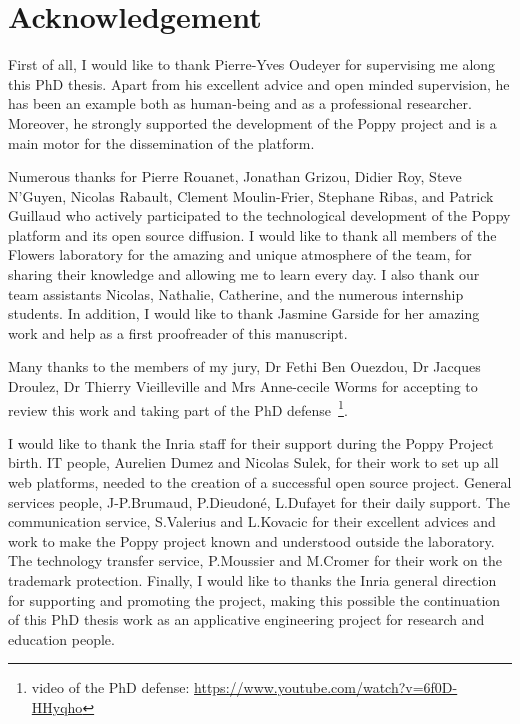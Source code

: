 %
\chapter*{Acknowledgement}
\label{sec:acknowledgement}
\vspace*{-10mm}


First of all, I would like to thank Pierre-Yves Oudeyer for supervising me along this PhD thesis.  Apart from his excellent advice and open minded supervision, he has been an example both as human-being and as a professional researcher. Moreover, he strongly supported the development of the Poppy project and is a main motor for the dissemination of the platform.

Numerous thanks for Pierre Rouanet, Jonathan Grizou, Didier Roy, Steve N'Guyen, Nicolas Rabault, Clement Moulin-Frier, Stephane Ribas, and Patrick Guillaud who actively participated to the technological development of the Poppy platform and its open source diffusion. I would like to thank all members of the Flowers laboratory for the amazing and unique atmosphere of the team, for sharing their knowledge and allowing me to learn every day. I also thank our team assistants Nicolas, Nathalie, Catherine, and the numerous internship students. In addition, I would like to thank Jasmine Garside for her amazing work and help as a first proofreader of this manuscript.

Many thanks to the members of my jury, Dr Fethi Ben Ouezdou, Dr Jacques Droulez, Dr Thierry Vieilleville and Mrs Anne-cecile Worms for accepting to review this work and taking part of the PhD defense~\footnote{video of the PhD defense: \url{https://www.youtube.com/watch?v=6f0D-HHyqho}}.

I would like to thank the Inria staff for their support during the Poppy Project birth. IT people, Aurelien Dumez and Nicolas Sulek, for their work to set up all web platforms, needed to the creation of a successful open source project. General services people, J-P.Brumaud, P.Dieudoné, L.Dufayet for their daily support. The communication service, S.Valerius and L.Kovacic for their excellent advices and work to make the Poppy project known and understood outside the laboratory. The technology transfer service, P.Moussier and M.Cromer for their work on the trademark protection.
Finally, I would like to thanks the Inria general direction for supporting and promoting the project, making this possible the continuation of this PhD thesis work as an applicative engineering project for research and education people.


